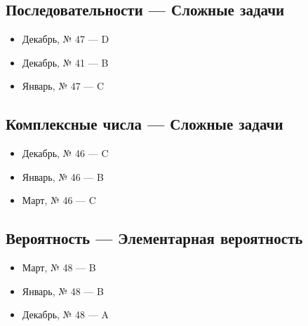 \subsection*{Последовательности — Сложные задачи}
\begin{itemize}
\item Декабрь, № 47 — D
\item Декабрь, № 41 — B
\item Январь, № 47 — C
\end{itemize}

\subsection*{Комплексные числа — Сложные задачи}
\begin{itemize}
\item Декабрь, № 46 — C
\item Январь, № 46 — B
\item Март, № 46 — C
\end{itemize}

\subsection*{Вероятность — Элементарная вероятность}
\begin{itemize}
\item Март, № 48 — B
\item Январь, № 48 — B
\item Декабрь, № 48 — A
\end{itemize}

